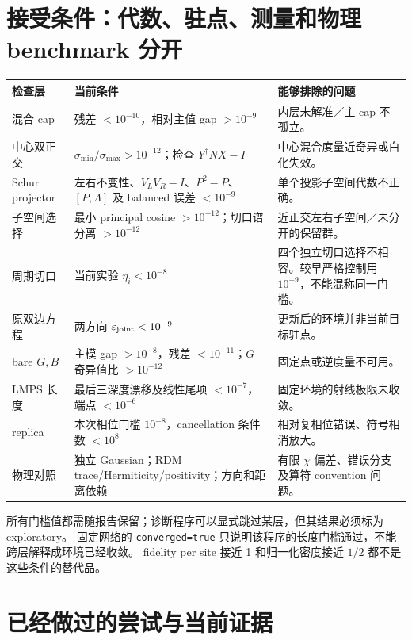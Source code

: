 \documentclass[11pt]{article}
\newcommand{\eps}{\varepsilon}
\newcommand{\code}[1]{{\small\texttt{#1}}}
\begin{document}
\section{接受条件：代数、驻点、测量和物理 benchmark 分开}
\begin{center}\small
\begin{tabular}{P{35mm}P{64mm}P{48mm}}
\toprule
检查层 & 当前条件 & 能够排除的问题 \\
\midrule
混合 cap & 残差 $<10^{-10}$，相对主值 gap $>10^{-9}$ & 内层未解准／主 cap 不孤立。\\
中心双正交 & $\sigma_{\min}/\sigma_{\max}>10^{-12}$；检查 $Y^\dagger NX-I$ & 中心混合度量近奇异或白化失效。\\
Schur projector & 左右不变性、$V_LV_R-I$、$P^2-P$、$[P,\Lambda]$ 及 balanced 误差 $<10^{-9}$ & 单个投影子空间代数不正确。\\
子空间选择 & 最小 principal cosine $>10^{-12}$；切口谱分离 $>10^{-12}$ & 近正交左右子空间／未分开的保留群。\\
周期切口 & 当前实验 $\eta_i<10^{-8}$ & 四个独立切口选择不相容。较早严格控制用 $10^{-9}$，不能混称同一门槛。\\
原双边方程 & 两方向 $\eps_{\rm joint}<10^{-9}$ & 更新后的环境并非当前目标驻点。\\
bare $G,B$ & 主模 gap $>10^{-8}$，残差 $<10^{-11}$；$G$ 奇异值比 $>10^{-12}$ & 固定点或逆度量不可用。\\
LMPS 长度 & 最后三深度漂移及线性尾项 $<10^{-7}$，端点 $<10^{-6}$ & 固定环境的射线极限未收敛。\\
replica & 本次相位门槛 $10^{-8}$，cancellation 条件数 $<10^8$ & 相对复相位错误、符号相消放大。\\
物理对照 & 独立 Gaussian；RDM trace/Hermiticity/positivity；方向和距离依赖 & 有限 $\chi$ 偏差、错误分支及算符 convention 问题。\\
\bottomrule
\end{tabular}
\end{center}
所有门槛值都需随报告保留；诊断程序可以显式跳过某层，但其结果必须标为 exploratory。
固定网络的 \code{converged=true} 只说明该程序的长度门槛通过，不能跨层解释成环境已经收敛。
fidelity per site 接近 1 和归一化密度接近 $1/2$ 都不是这些条件的替代品。

\section{已经做过的尝试与当前证据}
\label{sec:attempts}
\end{document}
